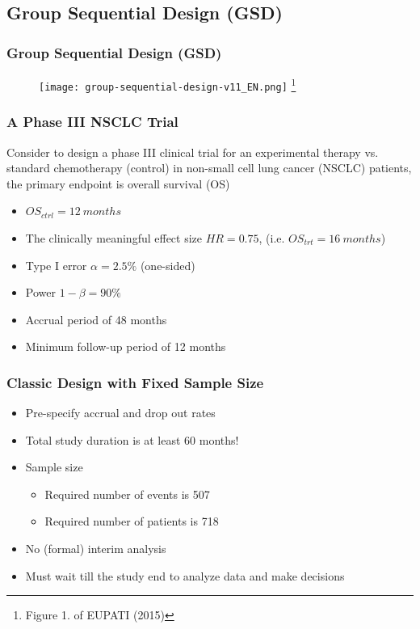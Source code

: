 \documentclass{beamer}
\begin{document}
\subsection{Group Sequential Design (GSD)}
\begin{frame}
	\frametitle{Group Sequential Design (GSD)}
	\begin{figure}
		\begin{center}
			\texttt{[image: group-sequential-design-v11\_EN.png]}
			\footnote{Figure 1. of EUPATI (2015)}
		\end{center}
	\end{figure}	
\end{frame}
\begin{frame}
	\frametitle{A Phase III NSCLC Trial}
Consider to design a phase III clinical trial for an experimental therapy vs. standard chemotherapy (control) in non-small cell lung cancer (NSCLC) patients, the primary endpoint is overall survival (OS)
  \begin{itemize}
  \item $OS_{ctrl}=12\ months$
  \item The clinically meaningful effect size $HR=0.75$, (i.e. $OS_{trt}=16\ months$) 
  \item Type I error $\alpha = 2.5\%$ (one-sided)
  \item Power $1-\beta = 90\%$
  \item Accrual period of 48 months 
  \item Minimum follow-up period of 12 months
\end{itemize}

\end{frame}
\begin{frame}
	\frametitle{Classic Design with Fixed Sample Size}
\begin{itemize}
		\item Pre-specify accrual and drop out rates
	    \item Total study duration is at least 60 months!
		\item Sample size \begin{itemize}
			\item Required number of events is 507
			\item Required number of patients is 718
		\end{itemize}
        \item No (formal) interim analysis
        \item Must wait till the study end to analyze data and make decisions
\end{itemize}
\end{frame}
\end{document}
